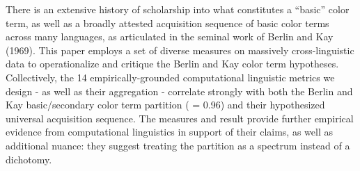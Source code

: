 There is an extensive history of scholarship into what constitutes a ``basic'' color term, as well as a broadly attested acquisition sequence of basic color terms across many languages, as articulated in the seminal work of Berlin and Kay (1969). This paper employs a set of diverse measures on massively cross-linguistic data to operationalize and critique the Berlin and Kay color term hypotheses. Collectively, the 14 empirically-grounded computational linguistic metrics we design - as well as their aggregation - correlate strongly with both the Berlin and Kay basic/secondary color term partition ({\gamma} = 0.96) and their hypothesized universal acquisition sequence. The measures and result provide further empirical evidence from computational linguistics in support of their claims, as well as additional nuance: they suggest treating the partition as a spectrum instead of a dichotomy.